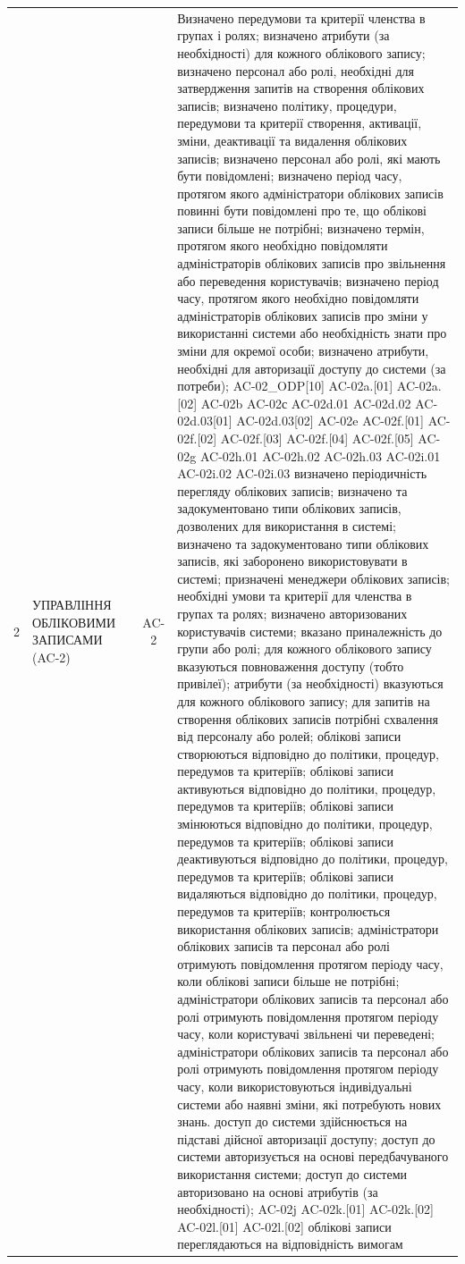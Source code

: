 \documentclass[10pt]{article}
\begin{document}
\begin{longtable}{|c|>{\raggedright\arraybackslash}p{2.5cm}|>{\raggedright\arraybackslash}p{4.5cm}|c|>{\raggedright\arraybackslash}p{4.5cm}|}
2 & УПРАВЛІННЯ ОБЛІКОВИМИ ЗАПИСАМИ (AC-2) &  & AC-2 & Визначено передумови та критерії членства в групах і ролях; визначено атрибути (за необхідності) для кожного облікового запису; визначено персонал або ролі, необхідні для затвердження запитів на створення облікових записів; визначено політику, процедури, передумови та критерії створення, активації, зміни, деактивації та видалення облікових записів; визначено персонал або ролі, які мають бути повідомлені; визначено період часу, протягом якого адміністратори облікових записів повинні бути повідомлені про те, що облікові записи більше не потрібні; визначено термін, протягом якого необхідно повідомляти адміністраторів облікових записів про звільнення або переведення користувачів; визначено період часу, протягом якого необхідно повідомляти адміністраторів облікових записів про зміни у використанні системи або необхідність знати про зміни для окремої особи; визначено атрибути, необхідні для авторизації доступу до системи (за потреби); AC-02\_\allowbreak{}ODP[10] AC-02a.[01] AC-02a.[02] AC-02b AC-02с AC-02d.01 AC-02d.02 AC-02d.03[01] AC-02d.03[02] AC-02e AC-02f.[01] AC-02f.[02] AC-02f.[03] AC-02f.[04] AC-02f.[05] AC-02g AC-02h.01 AC-02h.02 AC-02h.03 AC-02i.01 AC-02i.02 AC-02i.03 визначено періодичність перегляду облікових записів; визначено та задокументовано типи облікових записів, дозволених для використання в системі; визначено та задокументовано типи облікових записів, які заборонено використовувати в системі; призначені менеджери облікових записів; необхідні умови та критерії для членства в групах та ролях; визначено авторизованих користувачів системи; вказано приналежність до групи або ролі; для кожного облікового запису вказуються повноваження доступу (тобто привілеї); атрибути (за необхідності) вказуються для кожного облікового запису; для запитів на створення облікових записів потрібні схвалення від персоналу або ролей; облікові записи створюються відповідно до політики, процедур, передумов та критеріїв; облікові записи активуються відповідно до політики, процедур, передумов та критеріїв; облікові записи змінюються відповідно до політики, процедур, передумов та критеріїв; облікові записи деактивуються відповідно до політики, процедур, передумов та критеріїв; облікові записи видаляються відповідно до політики, процедур, передумов та критеріїв; контролюється використання облікових записів; адміністратори облікових записів та персонал або ролі отримують повідомлення протягом періоду часу, коли облікові записи більше не потрібні; адміністратори облікових записів та персонал або ролі отримують повідомлення протягом періоду часу, коли користувачі звільнені чи переведені; адміністратори облікових записів та персонал або ролі отримують повідомлення протягом періоду часу, коли використовуються індивідуальні системи або наявні зміни, які потребують нових знань. доступ до системи здійснюється на підставі дійсної авторизації доступу; доступ до системи авторизується на основі передбачуваного використання системи; доступ до системи авторизовано на основі атрибутів (за необхідності); AC-02j AC-02k.[01] AC-02k.[02] AC-02l.[01] AC-02l.[02] облікові записи переглядаються на відповідність вимогам 
\end{longtable}
\end{document}
